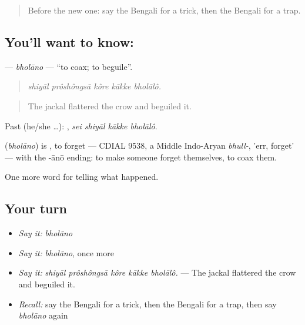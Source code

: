 \begin{quote}
Before the new one: say the Bengali for a trick, then the Bengali for a trap.
\end{quote}

\subsection*{You'll want to know: }
\textbf{} — \emph{bholāno} — \textquotedblleft{}to coax; to beguile\textquotedblright{}.

\begin{quote}
    
\end{quote}

\begin{quote}
\emph{shiyāl prôshôngsā kôre kākke bholālô.}
\end{quote}

\begin{quote}
The jackal flattered the crow and beguiled it.
\end{quote}

Past (he/she …):    , \emph{sei shiyāl kākke bholālô}.

\begin{cousinweb}
\textbf{} (\emph{bholāno}) is \textbf{}, to forget — CDIAL 9538, a Middle Indo-Aryan \emph{bhull-}, 'err, forget' — with the -ānō ending: to make someone forget themselves, to coax them.
\end{cousinweb}

\begin{grammarlens}[title={What you've built}]
One more word for telling what happened.
\end{grammarlens}

\subsection*{Your turn}
\begin{itemize}
\raggedright
  \item \emph{Say it:} \emph{bholāno}
  \item \emph{Say it:} \emph{bholāno}, once more
  \item \emph{Say it:} \emph{shiyāl prôshôngsā kôre kākke bholālô.} — The jackal flattered the crow and beguiled it.
  \item \emph{Recall:} say the Bengali for a trick, then the Bengali for a trap, then say \emph{bholāno} again
\end{itemize}

